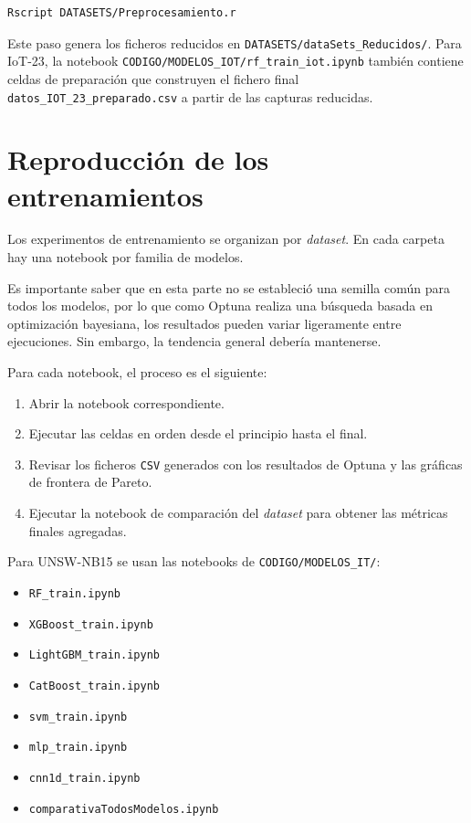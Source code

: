\begin{verbatim}
Rscript DATASETS/Preprocesamiento.r
\end{verbatim}

Este paso genera los ficheros reducidos en \texttt{DATASETS/dataSets\_Reducidos/}. Para IoT-23, la notebook \texttt{CODIGO/MODELOS\_IOT/rf\_train\_iot.ipynb} también contiene celdas de preparación que construyen el fichero final \texttt{datos\_IOT\_23\_preparado.csv} a partir de las capturas reducidas.

\section{Reproducción de los entrenamientos}

Los experimentos de entrenamiento se organizan por \textit{dataset}. En cada carpeta hay una notebook por familia de modelos.

Es importante saber que en esta parte no se estableció una semilla común para todos los modelos, por lo que como Optuna realiza una búsqueda basada en optimización bayesiana, los resultados pueden variar ligeramente entre ejecuciones. Sin embargo, la tendencia general debería mantenerse. 

Para cada notebook, el proceso es el siguiente:

\begin{enumerate}
    \item Abrir la notebook correspondiente.
    \item Ejecutar las celdas en orden desde el principio hasta el final.
    \item Revisar los ficheros \texttt{CSV} generados con los resultados de Optuna y las gráficas de frontera de Pareto.
    \item Ejecutar la notebook de comparación del \textit{dataset} para obtener las métricas finales agregadas.
\end{enumerate}

Para UNSW-NB15 se usan las notebooks de \texttt{CODIGO/MODELOS\_IT/}:

\begin{itemize}
    \item \texttt{RF\_train.ipynb}
    \item \texttt{XGBoost\_train.ipynb}
    \item \texttt{LightGBM\_train.ipynb}
    \item \texttt{CatBoost\_train.ipynb}
    \item \texttt{svm\_train.ipynb}
    \item \texttt{mlp\_train.ipynb}
    \item \texttt{cnn1d\_train.ipynb}
    \item \texttt{comparativaTodosModelos.ipynb}
\end{itemize}

